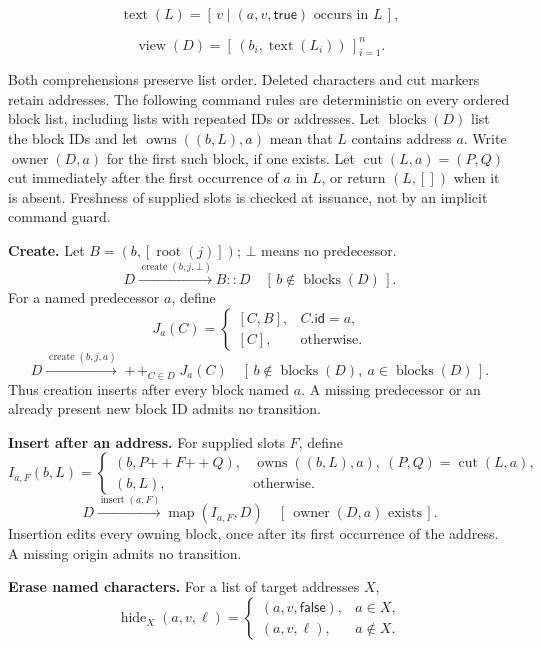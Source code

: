 \[
\operatorname{text}(L)=[\,v\mid(a,v,\mathsf{true})\text{ occurs in }L\,],
\]

\[
\operatorname{view}(D)=[\,(b_i,\operatorname{text}(L_i))\,]_{i=1}^{n}.
\]

Both comprehensions preserve list order. Deleted characters and cut markers
retain addresses. The following command rules are deterministic on every
ordered block list, including lists with repeated IDs or addresses. Let
$\operatorname{blocks}(D)$ list the block IDs and let
$\operatorname{owns}((b,L),a)$ mean that $L$ contains address $a$.
Write $\operatorname{owner}(D,a)$ for the first such block, if one exists.
Let $\operatorname{cut}(L,a)=(P,Q)$ cut immediately after the first
occurrence of $a$ in $L$, or return $(L,[])$ when it is absent. Freshness
of supplied slots is checked at issuance, not by an implicit command guard.

\textbf{Create.} Let $B=(b,[\operatorname{root}(j)])$; $\bot$ means no predecessor.
\[
D\xrightarrow{\operatorname{create}(b,j,\bot)}B::D
\quad[\,b\notin\operatorname{blocks}(D)\,].
\]
For a named predecessor $a$, define
\[
J_a(C)=\begin{cases}[C,B],&C.\mathsf{id}=a,\\{}[C],&\text{otherwise}.\end{cases}
\]
\[
D\xrightarrow{\operatorname{create}(b,j,a)}
\mathop{+\!+}_{C\in D}J_a(C)
\quad[\,b\notin\operatorname{blocks}(D),\ a\in\operatorname{blocks}(D)\,].
\]
Thus creation inserts after every block named $a$. A missing predecessor
or an already present new block ID admits no transition.

\textbf{Insert after an address.} For supplied slots $F$, define
\[
I_{a,F}(b,L)=\begin{cases}
(b,P\mathbin{+\!+}F\mathbin{+\!+}Q),&
 \operatorname{owns}((b,L),a),\ (P,Q)=\operatorname{cut}(L,a),\\
(b,L),&\text{otherwise}.
\end{cases}
\]
\[
D\xrightarrow{\operatorname{insert}(a,F)}
\operatorname{map}(I_{a,F},D)
\quad[\,\operatorname{owner}(D,a)\text{ exists}\,].
\]
Insertion edits every owning block, once after its first occurrence of the
address. A missing origin admits no transition.

\textbf{Erase named characters.} For a list of target addresses $X$,
\[
\operatorname{hide}_X(a,v,\ell)=\begin{cases}(a,v,\mathsf{false}),&a\in X,\\(a,v,\ell),&a\notin X.\end{cases}
\]


